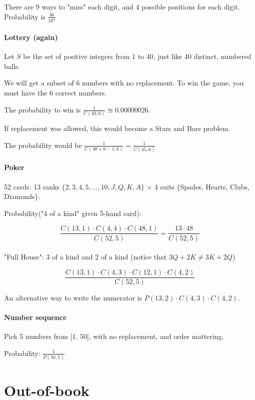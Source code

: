 \documentclass[english,openany]{book}
\begin{document}
    There are 9 ways to "miss" each digit, and 4 possible positions for each digit. Probability is $\frac{36}{10^4}$\\

    \subsubsection{Lottery (again)}

    Let $S$ be the set of positive integers from 1 to 40, just like 40 distinct, numbered balls.

    We will get a subset of 6 numbers with no replacement. To win the game, you must have the 6 correct numbers.

    The probability to win is $\frac{1}{C(40,6)} \approxeq 0.00000026$.

    If replacement was allowed, this would become a Stars and Bars problem.

    The probability would be $\frac{1}{C(40+6-1, 6)} = \frac{1}{C(45,6)}$\\

    \subsubsection{Poker}

    52 cards: 13 ranks $\{2,3,4,5,...,10,J,Q,K,A\}$ $\times$ 4 suits $\{$Spades, Hearts, Clubs, Diamonds$\}$.

    Probability("4 of a kind" given 5-hand card):

    $$\frac{C(13,1) \cdot C(4,4) \cdot C(48,1)}{C(52,5)} = \frac{13 \cdot 48}{C(52,5)}$$\\

    "Full House": 3 of a kind and 2 of a kind (notice that $3Q + 2K \neq 3K + 2Q$)

    $$\frac{C(13,1) \cdot C(4,3) \cdot C(12,1) \cdot C(4,2)}{C(52,5)}$$

    An alternative way to write the numerator is $P(13,2) \cdot C(4,3) \cdot C(4,2)$.\\

    \subsubsection{Number sequence}

    Pick 5 numbers from [1, 50], with no replacement, and order mattering.

    Probability: $\frac{1}{P(50,5)}$


    \chapter{Out-of-book}
\end{document}
